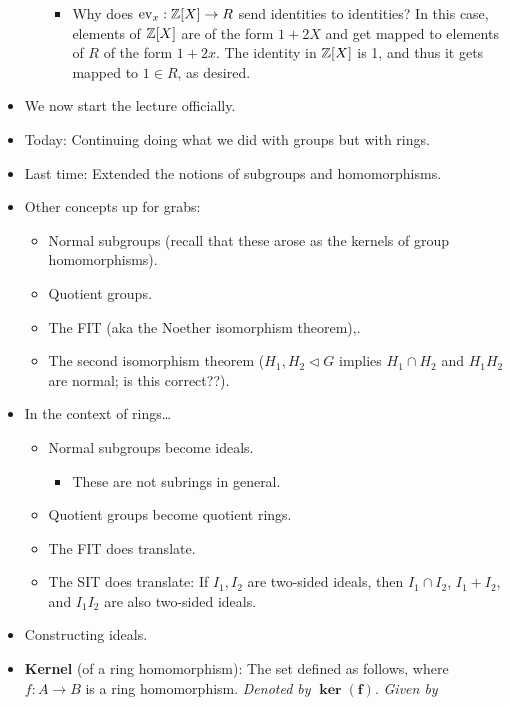 \documentclass[../notes.tex]{subfiles}
\begin{document}
\begin{itemize}
\begin{itemize}
        \begin{itemize}
            \item Why does $\operatorname{ev}_x:\mathbb{Z}[X]\to R$ send identities to identities? In this case, elements of $\mathbb{Z}[X]$ are of the form $1+2X$ and get mapped to elements of $R$ of the form $1+2x$. The identity in $\mathbb{Z}[X]$ is 1, and thus it gets mapped to $1\in R$, as desired.
        \end{itemize}
    \end{itemize}
    \item We now start the lecture officially.
    \item Today: Continuing doing what we did with groups but with rings.
    \item Last time: Extended the notions of subgroups and homomorphisms.
    \item Other concepts up for grabs:
    \begin{itemize}
        \item Normal subgroups (recall that these arose as the kernels of group homomorphisms).
        \item Quotient groups.
        \item The FIT (aka the Noether isomorphism theorem),.
        \item The second isomorphism theorem ($H_1,H_2\triangleleft G$ implies $H_1\cap H_2$ and $H_1H_2$ are normal; is this correct??).
    \end{itemize}
    \item In the context of rings\dots
    \begin{itemize}
        \item Normal subgroups become ideals.
        \begin{itemize}
            \item These are not subrings in general.
        \end{itemize}
        \item Quotient groups become quotient rings.
        \item The FIT does translate.
        \item The SIT does translate: If $I_1,I_2$ are two-sided ideals, then $I_1\cap I_2$, $I_1+I_2$, and $I_1I_2$ are also two-sided ideals.
    \end{itemize}
    \item Constructing ideals.
    \item \textbf{Kernel} (of a ring homomorphism): The set defined as follows, where $f:A\to B$ is a ring homomorphism. \emph{Denoted by} $\bm{\ker(f)}$. \emph{Given by}

\end{itemize}
\end{document}
